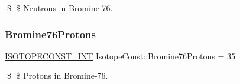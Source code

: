 \$ \$ Neutrons in Bromine-\/76. \mbox{\label{group___isotope_const-_bromine-_br76_ga814ad76350f742acc9fb8432147bb76c}} 
\subsubsection{\texorpdfstring{Bromine76\+Protons}{Bromine76Protons}}
{\footnotesize\ttfamily \mbox{\hyperlink{group___isotope_const-_macros_ga5f18360b3e99483a35c32d789e62621c}{I\+S\+O\+T\+O\+P\+E\+C\+O\+N\+S\+T\+\_\+\+I\+NT}} Isotope\+Const\+::\+Bromine76\+Protons = 35}

\$ \$ Protons in Bromine-\/76. 